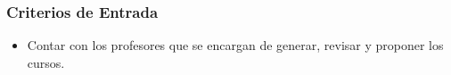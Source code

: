 \subsubsection{Criterios de Entrada}			%
	\begin{itemize}
		\item Contar con los profesores que se encargan de generar, revisar y proponer los cursos.		
	\end{itemize}